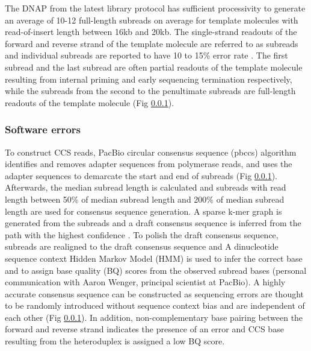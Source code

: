 The DNAP from the latest library protocol has sufficient processivity to generate an average of 10-12 full-length subreads on average for template molecules with read-of-insert length between 16kb and 20kb. The single-strand readouts of the forward and reverse strand of the template molecule are referred to as subreads and individual subreads are reported to have 10 to 15\% error rate \cite{Chaisson2012-vr}. The first subread and the last subread are often partial readouts of the template molecule resulting from internal priming and early sequencing termination respectively, while the subreads from the second to the penultimate subreads are full-length readouts of the template molecule (Fig \ref{}). 
%
%

\subsubsection{Software errors}

To construct CCS reads, PacBio circular consensus sequence (pbccs) algorithm identifies and removes adapter sequences from polymerase reads, and uses the adapter sequences to demarcate the start and end of subreads (Fig \ref{}). Afterwards, the median subread length is calculated and subreads with read length between 50\% of median subread length and 200\% of median subread length are used for consensus sequence generation. A sparse k-mer graph is generated from the subreads and a draft consensus sequence is inferred from the path with the highest confidence \cite{}. To polish the draft consensus sequence, subreads are realigned to the draft consensus sequence and A dinucleotide sequence context Hidden Markov Model (HMM) is used to infer the correct base and to assign base quality (BQ) scores from the observed subread bases (personal communication with Aaron Wenger, principal scientist at PacBio). A highly accurate consensus sequence can be constructed as sequencing errors are thought to be randomly introduced without sequence context bias and are independent of each other (Fig \ref{}). In addition, non-complementary base pairing between the forward and reverse strand indicates the presence of an error and CCS base resulting from the heteroduplex is assigned a low BQ score. 

%

